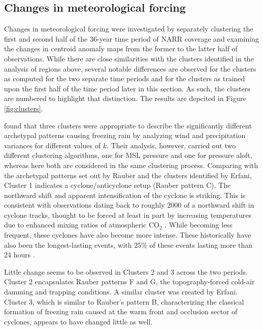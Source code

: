 \documentclass[twocol]{ametsoc}
\begin{document}
\subsection{Changes in meteorological forcing}
Changes in meteorological forcing were investigated by separately clustering the first and second half of the 36-year time period of NARR coverage and examining the changes in centroid anomaly maps from the former to the  latter half of observations. While there are close similarities with the clusters identified in the analysis of regions above, several notable differences are observed for the clusters as computed for the two separate time periods and for the clusters as trained upon the first half of the time period later in this section. As such, the clusters are numbered to highlight that distinction. The results are depcited in Figure \ref{fig:clusters}.

\citet{erfani2012automated} found that three clusters were appropriate to describe the significantly different archetypal patterns causing freezing rain by analyzing wind and precipitation variances for different values of $k$. Their analysis, however, carried out two different clustering algorithms, one for MSL pressure and one for pressure aloft, whereas here both are considered in the same clustering process. 
Comparing with the archetypal patterns set out by Rauber and the clusters identified by Erfani, Cluster 1 indicates a cyclone/anticyclone setup (Rauber pattern C). The northward shift and apparent intensification of the cyclone is striking. This is consistent with observations dating back to roughly 2000 of a northward shift in cyclone tracks, thought to be forced at least in part by increasing temperatures due to enhanced mixing ratios of atmospheric CO$_2$ \citep{mccabe2001trends}. While becoming less frequent, these cyclones have also become more intense. These historically have also been the longest-lasting events, with 25\% of these events lasting more than 24 hours \citep{rauber2001synoptic}. 

Little change seems to be observed in Clusters 2 and 3 across the two periods. Cluster 2 encapsulates Rauber patterns F and G, the topography-forced cold-air damming and trapping conditions. A similar cluster was created by Erfani. Cluster 3, which is similar to Rauber's pattern B, characterizing the classical formation of freezing rain caused at the warm front and occlusion sector of cyclones, appears to have changed little as well.
\end{document}
